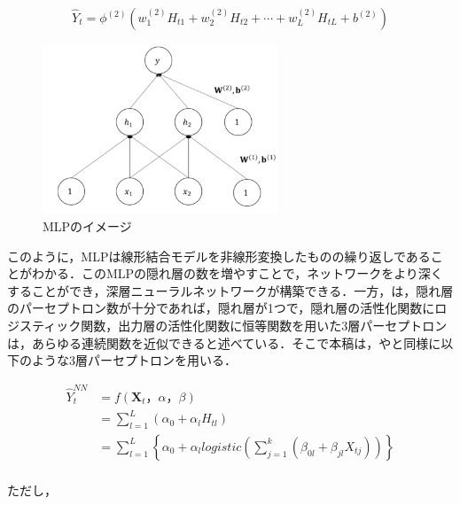 \documentclass[a4paper，12pt]{jsarticle}
\begin{document}
\begin{equation}
  \begin{split}
    \hat{Y}_t = \phi^{(2)} \left( w^{(2)}_{1} H_{t1} + w^{(2)}_{2} H_{t2} + \cdots + w^{(2)}_{L} H_{tL} + b^{(2)} \right)
  \end{split}
\end{equation}

\begin{figure}
  \centering
  \caption{MLPのイメージ}
  \label{fig:mlp}
  \includegraphics[width=7cm]{./img/_ann_mlp.png}
\end{figure}

このように，MLPは線形結合モデルを非線形変換したものの繰り返しであることがわかる．このMLPの隠れ層の数を増やすことで，ネットワークをより深くすることができ，深層ニューラルネットワークが構築できる．一方，\cite{qi1999nonlinear}は，隠れ層のパーセプトロン数が十分であれば，隠れ層が1つで，隠れ層の活性化関数にロジスティック関数，出力層の活性化関数に恒等関数を用いた3層パーセプトロンは，あらゆる連続関数を近似できると述べている．そこで本稿は，\cite{callen1996neural}や\cite{zhang2004neural}と同様に以下のような3層パーセプトロンを用いる．

\begin{equation}
  \begin{split}
    \hat{Y}_t^{NN} 
    &= f({\bm{X}_t，\alpha，\beta}) \\
    &= \sum^{L}_{l=1} \left(\alpha_0 + \alpha_l H_{tl} \right) \\
    &= \sum^{L}_{l=1} \left\{ \alpha_0 + \alpha_l \textit{logistic} \left(\sum^{k}_{j=1} \left(\beta_{0l} + \beta_{jl} X_{tj} \right) \right) \right\} \\
  \end{split}
\end{equation}

ただし，
\end{document}
